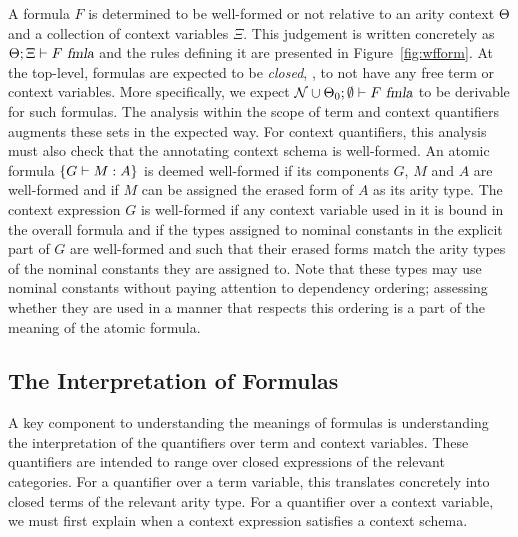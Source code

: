 A formula $F$ is determined to be well-formed or not relative to an arity
context $\Theta$ and a collection of context variables $\Xi$.
%
This judgement is written concretely as $\Theta;\Xi \vdash F\ \mbox{\sl fmla}$
and the rules defining it are presented in Figure~\ref{fig:wfform}.
%
At the top-level, formulas are expected to be \emph{closed}, \ie, to not have
any free term or context variables.
%
More specifically, we expect $\mathcal{N} \cup \Theta_0;\emptyset \vdash F\ \mbox{\sl fmla}$ to be
derivable for such formulas. 
%
The analysis within the scope of term and context
quantifiers augments these sets in the expected way.
%
For context quantifiers, this analysis must also check that the
annotating context schema is well-formed.
%
An atomic formula $\left\{G \vdash M:A\right\}$ is deemed well-formed if its
components $G$, $M$ and $A$ are well-formed and if $M$ can be assigned
the erased form of $A$ as its arity type.
%
The context expression $G$ is well-formed if any context variable used
in it is bound in the overall formula and if the types assigned to
nominal constants in the explicit part of $G$ are well-formed and
such that their erased forms match the arity types of the nominal
constants they are assigned to.
%
Note that these types may use nominal constants without paying
attention to dependency ordering; assessing
whether they are used in a manner that respects this ordering is a part
of the meaning of the atomic formula.


\subsection{The Interpretation of Formulas}

A key component to understanding the meanings of formulas is
understanding the interpretation of the quantifiers over term and
context variables.
%
These quantifiers are intended to range over closed expressions of the
relevant categories.
%
For a quantifier over a term variable, this translates concretely into
closed terms of the relevant arity type.
%
For a quantifier over a context variable, we must first explain when
a context expression satisfies a context schema. 

